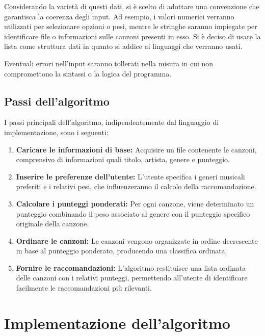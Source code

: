 \documentclass[a4paper,11pt]{article}
\begin{document}
    Considerando la varietà di questi dati, si è scelto di adottare una convenzione che garantisca la coerenza degli input. Ad esempio, i valori numerici verranno utilizzati per selezionare opzioni o pesi, mentre le stringhe saranno impiegate per identificare file o informazioni sulle canzoni presenti in esso. Si è deciso di usare la lista come struttura dati in quanto si addice ai linguaggi che verranno usati.

    Eventuali errori nell'input saranno tollerati nella misura in cui non compromettono la sintassi o la logica del programma.

    \subsection{Passi dell'algoritmo}
    I passi principali dell'algoritmo, indipendentemente dal linguaggio di implementazione, sono i seguenti:

    \begin{enumerate}
        \item \textbf{Caricare le informazioni di base:}
        Acquisire un file contenente le canzoni, comprensivo di informazioni quali titolo, artista, genere e punteggio.
        \item \textbf{Inserire le preferenze dell'utente:}
        L’utente specifica i generi musicali preferiti e i relativi pesi, che influenzeranno il calcolo della raccomandazione.
        \item \textbf{Calcolare i punteggi ponderati:}
        Per ogni canzone, viene determinato un punteggio combinando il peso associato al genere con il punteggio specifico originale della canzone.
        \item \textbf{Ordinare le canzoni:}
        Le canzoni vengono organizzate in ordine decrescente in base al punteggio ponderato, producendo una classifica ordinata.
        \item \textbf{Fornire le raccomandazioni:}
        L'algoritmo restituisce una lista ordinata delle canzoni con i relativi punteggi, permettendo all'utente di identificare facilmente le raccomandazioni più rilevanti.
    \end{enumerate}
    \newpage
    \section{Implementazione dell'algoritmo}
\end{document}
